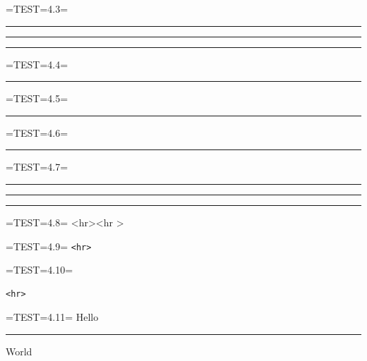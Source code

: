 \documentclass[a4paper]{article}
\begin{document}
=TEST=4.3=
\par\noindent\rule{\textwidth}{0.4pt}
\par\noindent\rule{\textwidth}{0.4pt}
\par\noindent\rule{\textwidth}{0.4pt}


=TEST=4.4=
\par\noindent\rule{\textwidth}{0.4pt}


=TEST=4.5=
\par\noindent\rule{\textwidth}{0.4pt}



=TEST=4.6=
\par\noindent\rule{\textwidth}{0.4pt}


=TEST=4.7=
   \par\noindent\rule{\textwidth}{0.4pt}
     
         \par\noindent\rule{\textwidth}{0.4pt}
           

  \par\noindent\rule{\textwidth}{0.4pt}
        

=TEST=4.8=
\textless hr\textgreater \textless hr \textgreater 

=TEST=4.9=
\verb`<hr>`

=TEST=4.10=
\begin{verbatim}
<hr>
\end{verbatim}

=TEST=4.11=
Hello\par\noindent\rule{\textwidth}{0.4pt}
World
\end{document}
